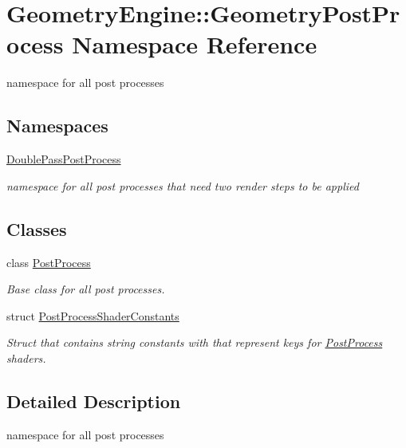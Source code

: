 \hypertarget{namespace_geometry_engine_1_1_geometry_post_process}{}\section{Geometry\+Engine\+::Geometry\+Post\+Process Namespace Reference}
\label{namespace_geometry_engine_1_1_geometry_post_process}


namespace for all post processes  


\subsection*{Namespaces}
\begin{DoxyCompactItemize}
\item 
 \mbox{\hyperlink{namespace_geometry_engine_1_1_geometry_post_process_1_1_double_pass_post_process}{Double\+Pass\+Post\+Process}}
\begin{DoxyCompactList}\small\item\em namespace for all post processes that need two render steps to be applied \end{DoxyCompactList}\end{DoxyCompactItemize}
\subsection*{Classes}
\begin{DoxyCompactItemize}
\item 
class \mbox{\hyperlink{class_geometry_engine_1_1_geometry_post_process_1_1_post_process}{Post\+Process}}
\begin{DoxyCompactList}\small\item\em Base class for all post processes. \end{DoxyCompactList}\item 
struct \mbox{\hyperlink{struct_geometry_engine_1_1_geometry_post_process_1_1_post_process_shader_constants}{Post\+Process\+Shader\+Constants}}
\begin{DoxyCompactList}\small\item\em Struct that contains string constants with that represent keys for \mbox{\hyperlink{class_geometry_engine_1_1_geometry_post_process_1_1_post_process}{Post\+Process}} shaders. \end{DoxyCompactList}\end{DoxyCompactItemize}


\subsection{Detailed Description}
namespace for all post processes 